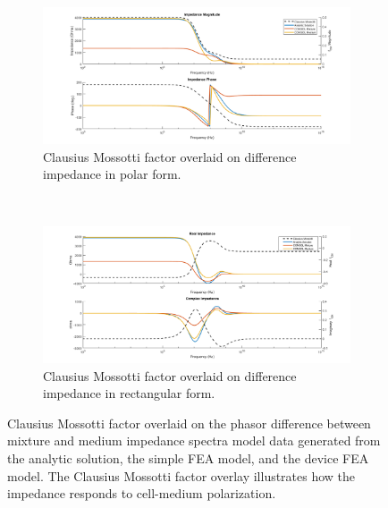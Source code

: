 \begin{figure}[t!]
    \centering
    \begin{subfigure}[b]{\textwidth}
        \centering
        \includegraphics[width=\textwidth]{images/IS_model_difference_mag_phase_CM_overlay.png}
        \caption{Clausius Mossotti factor overlaid on difference impedance in polar form.}
        \label{fig:IS_model_difference_fcm_overlay_a}
    \end{subfigure}
    \\
    \vspace{0.1 in}
    \begin{subfigure}[b]{\textwidth}
        \centering
        \includegraphics[width=\textwidth]{images/IS_model_real_imag_difference_CM_overlay.png}
        \caption{Clausius Mossotti factor overlaid on difference impedance in rectangular form.}
    \end{subfigure}

    \caption[Clausius Mossotti factor overlaid on IS model data.]{Clausius Mossotti factor overlaid on the phasor difference between mixture and medium impedance spectra model data generated from the analytic solution, the simple FEA model, and the device FEA model. The Clausius Mossotti factor overlay illustrates how the impedance responds to cell-medium polarization.}
    \label{fig:IS_model_difference_fcm_overlay}
\end{figure}

